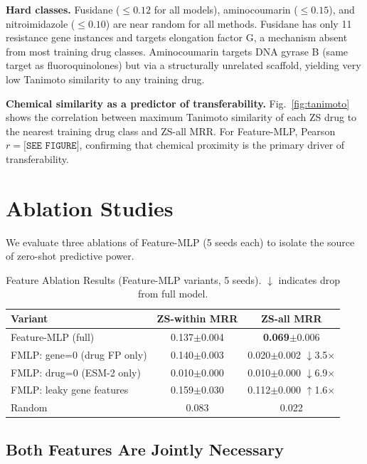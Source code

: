 \documentclass[conference]{IEEEtran}
\begin{document}
\textbf{Hard classes.}
Fusidane ($\leq 0.12$ for all models), aminocoumarin ($\leq 0.15$), and
nitroimidazole ($\leq 0.10$) are near random for all methods. Fusidane has
only 11 resistance gene instances and targets elongation factor G, a mechanism
absent from most training drug classes. Aminocoumarin targets DNA gyrase B
(same target as fluoroquinolones) but via a structurally unrelated scaffold,
yielding very low Tanimoto similarity to any training drug.

\textbf{Chemical similarity as a predictor of transferability.}
Fig.~\ref{fig:tanimoto} shows the correlation between maximum Tanimoto
similarity of each ZS drug to the nearest training drug class and ZS-all MRR.
For Feature-MLP, Pearson $r = \texttt{[SEE FIGURE]}$, confirming that
chemical proximity is the primary driver of transferability.

\section{Ablation Studies}
\label{sec:ablations}

We evaluate three ablations of Feature-MLP (5 seeds each) to isolate the
source of zero-shot predictive power.

\begin{table}[t]
\centering
\caption{Feature Ablation Results (Feature-MLP variants, 5 seeds).
$\downarrow$ indicates drop from full model.}
\label{tab:ablations}
\begin{tabular}{lcc}
\toprule
\textbf{Variant} & \textbf{ZS-within MRR} & \textbf{ZS-all MRR} \\
\midrule
Feature-MLP (full)             & 0.137$\pm$0.004 & \textbf{0.069}$\pm$0.006 \\
FMLP: gene=0 (drug FP only)    & 0.140$\pm$0.003 & 0.020$\pm$0.002 $\downarrow$3.5$\times$ \\
FMLP: drug=0 (ESM-2 only)      & 0.010$\pm$0.000 & 0.010$\pm$0.000 $\downarrow$6.9$\times$ \\
FMLP: leaky gene features      & 0.159$\pm$0.030 & 0.112$\pm$0.000 $\uparrow$1.6$\times$ \\
\midrule
Random                         & 0.083           & 0.022           \\
\bottomrule
\end{tabular}
\end{table}

\subsection{Both Features Are Jointly Necessary}
\end{document}
